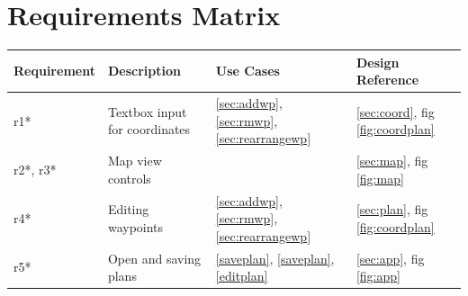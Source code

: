 \documentclass[12pt, letterpaper]{article}
\begin{document}
\section{Requirements Matrix}\label{sec:matrix}

\begin{tabularx}{\textwidth}{l X l l}
  \hline
\textbf{Requirement} & \textbf{Description} & \textbf{Use Cases} & \textbf{Design Reference}\\
\hline
\hline
r1* & Textbox input for coordinates & \ref{sec:addwp}, \ref{sec:rmwp}, \ref{sec:rearrangewp} & \ref{sec:coord}, fig \ref{fig:coordplan} \\
r2*, r3* & Map view controls & & \ref{sec:map}, fig \ref{fig:map}\\
r4* & Editing waypoints &  \ref{sec:addwp}, \ref{sec:rmwp}, \ref{sec:rearrangewp} & \ref{sec:plan}, fig \ref{fig:coordplan}\\
r5* & Open and saving plans & \ref{saveplan}, \ref{saveplan}, \ref{editplan} & \ref{sec:app}, fig \ref{fig:app}\\
\hline

\end{tabularx}
\newpage
\appendix

{}

\end{document}
